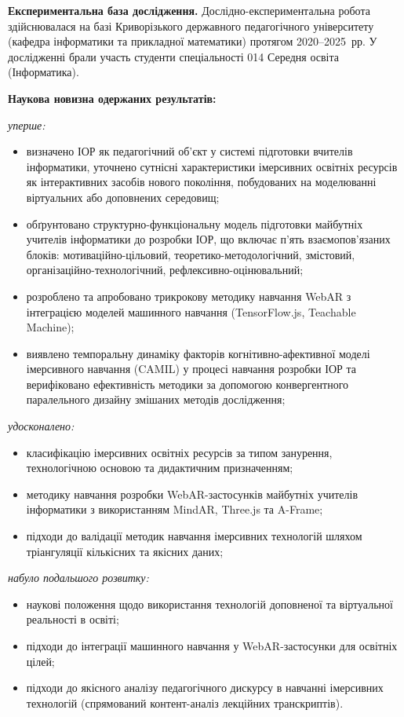 \textbf{Експериментальна база дослідження.} Дослідно-експериментальна робота здійснювалася на базі Криворізького державного педагогічного університету (кафедра інформатики та прикладної математики) протягом 2020--2025~рр. У дослідженні брали участь студенти спеціальності 014 Середня освіта (Інформатика).

\textbf{Наукова новизна одержаних результатів:}

\textit{уперше:}
\begin{itemize}
    \item визначено ІОР як педагогічний об'єкт у системі підготовки вчителів інформатики, уточнено сутнісні характеристики імерсивних освітніх ресурсів як інтерактивних засобів нового покоління, побудованих на моделюванні віртуальних або доповнених середовищ;
    \item обґрунтовано структурно-функціональну модель підготовки майбутніх учителів інформатики до розробки ІОР, що включає п'ять взаємопов'язаних блоків: мотиваційно-цільовий, теоретико-методологічний, змістовий, організаційно-технологічний, рефлексивно-оцінювальний;
    \item розроблено та апробовано трикрокову методику навчання WebAR з інтеграцією моделей машинного навчання (TensorFlow.js, Teachable Machine);
    \item виявлено темпоральну динаміку факторів когнітивно-афективної моделі імерсивного навчання (CAMIL) у процесі навчання розробки ІОР та верифіковано ефективність методики за допомогою конвергентного паралельного дизайну змішаних методів дослідження;
\end{itemize}

\textit{удосконалено:}
\begin{itemize}
    \item класифікацію імерсивних освітніх ресурсів за типом занурення, технологічною основою та дидактичним призначенням;
    \item методику навчання розробки WebAR-застосунків майбутніх учителів інформатики з використанням MindAR, Three.js та A-Frame;
    \item підходи до валідації методик навчання імерсивних технологій шляхом тріангуляції кількісних та якісних даних;
\end{itemize}

\textit{набуло подальшого розвитку:}
\begin{itemize}
    \item наукові положення щодо використання технологій доповненої та віртуальної реальності в освіті;
    \item підходи до інтеграції машинного навчання у WebAR-застосунки для освітніх цілей;
    \item підходи до якісного аналізу педагогічного дискурсу в навчанні імерсивних технологій (спрямований контент-аналіз лекційних транскриптів).
\end{itemize}

